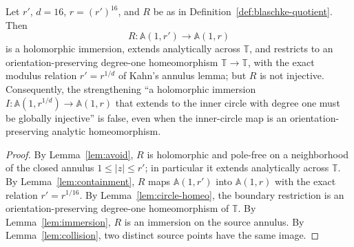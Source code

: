 \begin{theorem}\label{thm:annulus-nogo}
Let \(r'\), \(d=16\), \(r=(r')^{16}\), and \(R\) be as in Definition~\ref{def:blaschke-quotient}. Then
\[ R:\mathbb A(1,r')\longrightarrow\mathbb A(1,r) \]
is a holomorphic immersion, extends analytically across \(\mathbb T\), and restricts to an orientation-preserving degree-one homeomorphism \(\mathbb T\to\mathbb T\), with the exact modulus relation \(r'=r^{1/d}\) of Kahn's annulus lemma; but \(R\) is not injective. Consequently, the strengthening ``a holomorphic immersion \(I:\mathbb A(1,r^{1/d})\to\mathbb A(1,r)\) that extends to the inner circle with degree one must be globally injective'' is false, even when the inner-circle map is an orientation-preserving analytic homeomorphism.
\end{theorem}

\begin{proof}
By Lemma~\ref{lem:avoid}, \(R\) is holomorphic and pole-free on a neighborhood of the closed annulus \(1\le|z|\le r'\); in particular it extends analytically across \(\mathbb T\). By Lemma~\ref{lem:containment}, \(R\) maps \(\mathbb A(1,r')\) into \(\mathbb A(1,r)\) with the exact relation \(r'=r^{1/16}\). By Lemma~\ref{lem:circle-homeo}, the boundary restriction is an orientation-preserving degree-one homeomorphism of \(\mathbb T\). By Lemma~\ref{lem:immersion}, \(R\) is an immersion on the source annulus. By Lemma~\ref{lem:collision}, two distinct source points have the same image. 
\end{proof}